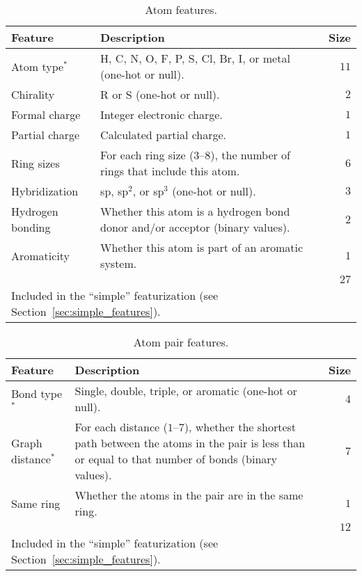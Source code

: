\begin{table*}[htbp]
    \caption{Atom features.}
    \label{table:atom_features}
    \centering
    \begin{tabular}{ l l r }
    \toprule
    Feature & Description & Size \\
    \midrule
    Atom type$^*$ & H, C, N, O, F, P, S, Cl, Br, I, or metal (one-hot or null).
                  & $11$ \\
    Chirality & R or S (one-hot or null). & $2$ \\
    Formal charge & Integer electronic charge. & $1$ \\
    Partial charge & Calculated partial charge. & $1$ \\
    Ring sizes & For each ring size ($3$--$8$), the number of rings that include
                 this atom. & $6$ \\
    Hybridization & sp, sp$^2$, or sp$^3$ (one-hot or null). & $3$ \\
    Hydrogen bonding & Whether this atom is a hydrogen bond donor and/or
                       acceptor (binary values). & $2$ \\
    Aromaticity & Whether this atom is part of an aromatic system. & $1$ \\
    \midrule
    \cellcolor{white} & \cellcolor{white} & \cellcolor{white}$27$ \\
    \bottomrule
    \multicolumn{3}{l}{\small * Included in the ``simple'' featurization (see
                       Section~\ref{sec:simple_features}).}
    \end{tabular}
\end{table*}

\begin{table*}[htbp]
    \caption{Atom pair features.}
    \label{table:pair_features}
    \centering
    \begin{tabular}{ l l r }
    \toprule
    Feature & Description & Size \\
    \midrule
    Bond type$^*$ & Single, double, triple, or aromatic (one-hot or null).
                  & $4$ \\
    Graph distance$^*$ &
        \makecell[l]{For each distance ($1$--$7$), whether the shortest path \\
        between the atoms in the pair is less than or equal \\
        to that number of bonds (binary values).}
        & $7$ \\
    Same ring & Whether the atoms in the pair are in the same ring. & $1$ \\
    \midrule
     & & $12$ \\
    \bottomrule
    \multicolumn{3}{l}{\cellcolor{white}\small * Included in the ``simple''
                       featurization (see Section~\ref{sec:simple_features}).}
    \end{tabular}
\end{table*}

